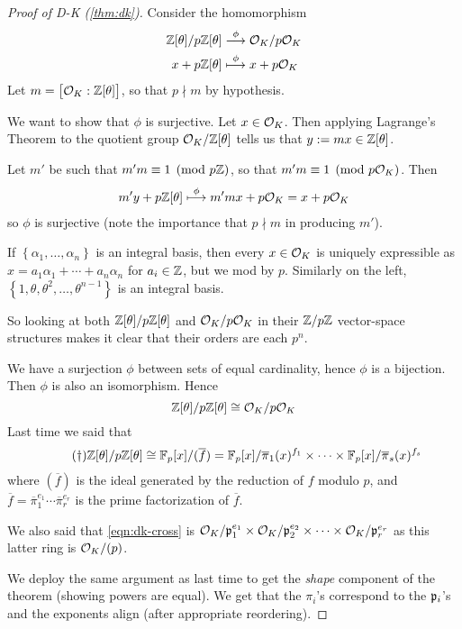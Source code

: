 \begin{proof}[Proof of D-K (\cref{thm:dk})]
    Consider the homomorphism
    \begin{align*}
        \mathbb Z[\theta]/p\mathbb Z[\theta] & \overset{\phi}{\longrightarrow} \mathcal{O}_K/p\mathcal{O}_K \\
        x + p\mathbb Z[\theta]         & \overset{\phi}{\longmapsto} x + p\mathcal{O}_K
    \end{align*}
    Let $m = \big[\mathcal{O}_K : \mathbb Z[\theta]\big]$, so that $p\nmid m$ by hypothesis.

    We want to show that $\phi$ is surjective. Let $x\in\mathcal{O}_K$. Then applying Lagrange's Theorem to the quotient group $\mathcal{O}_K/\mathbb Z[\theta]$ tells us that $y:= mx\in\mathbb Z[\theta]$.

    Let $m'$ be such that $m'm \equiv 1\pmod{p\mathbb Z}$, so that $m'm\equiv 1\pmod{p\mathcal{O}_K}$. Then
    \begin{align*}
        m'y + p\mathbb Z[\theta] \overset{\phi}{\longmapsto} m'mx + p\mathcal{O}_K = x + p\mathcal{O}_K
    \end{align*}
    so $\phi$ is surjective (note the importance that $p\nmid m$ in producing $m'$).

    If $\left\{ \alpha_1, \dots, \alpha_n \right\}$ is an integral basis, then every $x\in\mathcal{O}_K$ is uniquely expressible as $x = a_1\alpha_1 + \cdots + a_n\alpha_n$ for $a_i\in\mathbb Z$, but we mod by $p$. Similarly on the left, $\left\{ 1, \theta, \theta^2, \dots, \theta^{n-1} \right\}$ is an integral basis.

    So looking at both $\mathbb Z[\theta]/p\mathbb Z[\theta]$ and $\mathcal{O}_K/p\mathcal{O}_K$ in their $\mathbb Z/p\mathbb Z$ vector-space structures makes it clear that their orders are each $p^n$.

    We have a surjection $\phi$ between sets of equal cardinality, hence $\phi$ is a bijection. Then $\phi$ is also an isomorphism. Hence
    \[\mathbb Z[\theta]/p\mathbb Z[\theta]\cong \mathcal{O}_K / p\mathcal{O}_K\]
    Last time we said that
    \begin{equation}
        \label{eqn:dk-cross}\tag{\textdagger}
        \mathbb Z[\theta]/p\mathbb Z[\theta]\cong \mathbb F_p[x]/(\overline{f}) = \mathbb F_p[x]/\overline{\pi}_1(x)^{f_1}\times \cdots \times \mathbb F_p[x]/\overline{\pi}_s(x)^{f_s}
    \end{equation}
    where $(\overline{f})$ is the ideal generated by the reduction of $f$ modulo $p$, and $\overline{f} = \overline{\pi}_1^{e_1}\cdots \overline{\pi}_r^{e_r}$ is the prime factorization of $\overline{f}$.

    We also said that \cref{eqn:dk-cross} is $\mathcal{O}_K/\mathfrak{p}_1^{e_1}\times \mathcal{O}_K/\mathfrak{p}_2^{e_2}\times \cdots\times \mathcal{O}_K/\mathfrak{p}_r^{e_r}$ as this latter ring is $\mathcal{O}_K/(p)$.

    We deploy the same argument as last time to get the \emph{shape} component of the theorem (showing powers are equal). We get that the $\pi_i$'s correspond to the $\mathfrak{p}_i$'s and the exponents align (after appropriate reordering).
\end{proof}